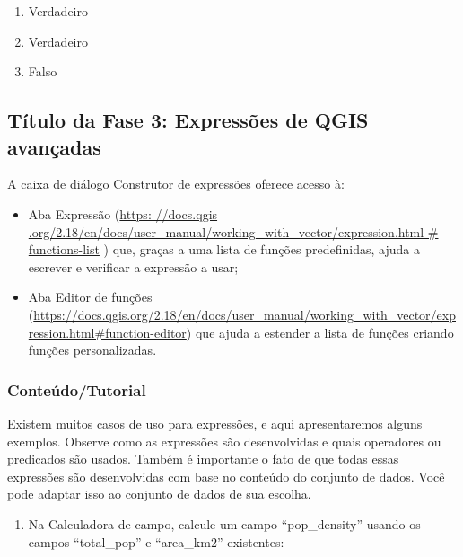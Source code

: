 \documentclass[
]{book}
\providecommand{\tightlist}{%
  \setlength{\itemsep}{0pt}\setlength{\parskip}{0pt}}
\begin{document}
\begin{enumerate}
\def\labelenumi{\arabic{enumi}.}
\tightlist
\item
  Verdadeiro
\item
  Verdadeiro
\item
  Falso
\end{enumerate}

\hypertarget{tuxedtulo-da-fase-3-expressuxf5es-de-qgis-avanuxe7adas}{%
\subsection{Título da Fase 3: Expressões de QGIS avançadas}\label{tuxedtulo-da-fase-3-expressuxf5es-de-qgis-avanuxe7adas}}

A caixa de diálogo Construtor de expressões oferece acesso à:

\begin{itemize}
\tightlist
\item
  Aba Expressão (\href{https://docs.qgis.org/2.18/en/docs/user_manual/working_with_vector/expression.html\#functions-list}{https: //docs.qgis .org/2.18/en/docs/user\_manual/working\_with\_vector/expression.html \# functions-list} ) que, graças a uma lista de funções predefinidas, ajuda a escrever e verificar a expressão a usar;
\item
  Aba Editor de funções (\href{https://docs.qgis.org/2.18/en/docs\%20/user_manual/working_with_vector/expression.html\#function-editor}{https://docs.qgis.org/2.18/en/docs/user\_manual/working\_with\_vector/expression.html\#function-editor}) que ajuda a estender a lista de funções criando funções personalizadas.
\end{itemize}

\hypertarget{conteuxfadotutorial-4}{%
\subsubsection{\texorpdfstring{\textbf{Conteúdo/Tutorial}}{Conteúdo/Tutorial}}\label{conteuxfadotutorial-4}}

Existem muitos casos de uso para expressões, e aqui apresentaremos alguns exemplos. Observe como as expressões são desenvolvidas e quais operadores ou predicados são usados. Também é importante o fato de que todas essas expressões são desenvolvidas com base no conteúdo do conjunto de dados. Você pode adaptar isso ao conjunto de dados de sua escolha.

\begin{enumerate}
\def\labelenumi{\arabic{enumi}.}
\tightlist
\item
  Na Calculadora de campo, calcule um campo ``pop\_density'' usando os campos ``total\_pop'' e ``area\_km2'' existentes:
\end{enumerate}
\end{document}
